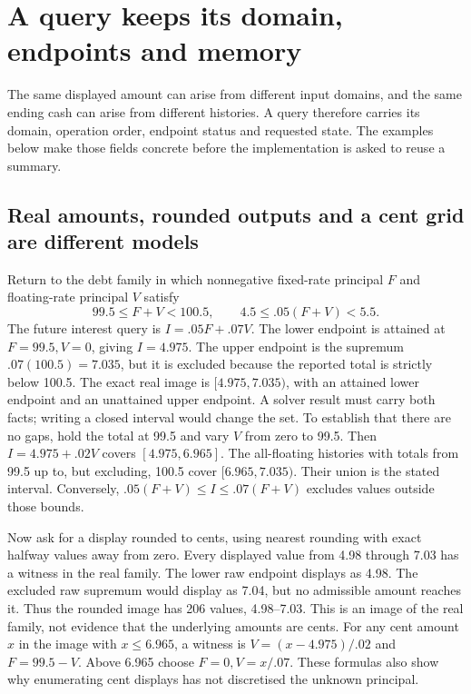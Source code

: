 \section{A query keeps its domain, endpoints and memory}
\label{sec:query-resolution-boundaries}

The same displayed amount can arise from different input domains, and the
same ending cash can arise from different histories. A query therefore carries
its domain, operation order, endpoint status and requested state. The examples
below make those fields concrete before the implementation is asked to reuse a
summary.

\subsection*{Real amounts, rounded outputs and a cent grid are different models}

Return to the debt family in which nonnegative fixed-rate principal \(F\) and
floating-rate principal \(V\) satisfy
\[
 99.5\le F+V<100.5,\qquad
 4.5\le .05(F+V)<5.5.
\]
The future interest query is \(I=.05F+.07V\). The lower endpoint is attained
at \(F=99.5,V=0\), giving \(I=4.975\). The upper endpoint is the supremum
\(.07(100.5)=7.035\), but it is excluded because the reported total is
strictly below 100.5. The exact real image is
\([4.975,7.035)\), with an attained lower endpoint and an unattained upper
endpoint. A solver result must carry both facts; writing a closed interval
would change the set. To establish that there are no gaps, hold the total at
99.5 and vary \(V\) from zero to 99.5. Then
\(I=4.975+.02V\) covers \([4.975,6.965]\). The all-floating histories
with totals from 99.5 up to, but excluding, 100.5 cover
\([6.965,7.035)\). Their union is the stated interval. Conversely,
\(.05(F+V)\le I\le .07(F+V)\) excludes values outside those bounds.

Now ask for a display rounded to cents, using nearest rounding with exact
halfway values away from zero. Every displayed value from 4.98 through 7.03
has a witness in the real family. The lower raw endpoint displays as 4.98.
The excluded raw supremum would display as 7.04, but no admissible amount
reaches it. Thus the rounded image has 206 values, 4.98--7.03. This is an
image of the real family, not evidence that the underlying amounts are cents.
For any cent amount \(x\) in the image with \(x\le6.965\), a witness is
\(V=(x-4.975)/.02\) and \(F=99.5-V\). Above 6.965 choose
\(F=0,V=x/.07\). These formulas also show why enumerating cent displays
has not discretised the unknown principal.

